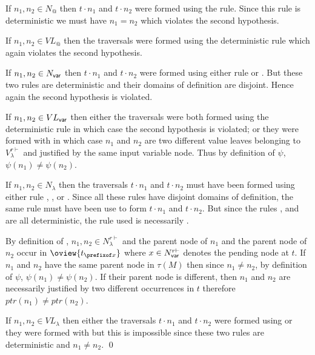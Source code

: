 \begin{compactitem}
\item If $n_1, n_2 \in N_@$ then $t
\cdot n_1$ and $t \cdot n_2$ were formed using the 
rule. Since this rule is deterministic we must have $n_1=n_2$ which
violates the second hypothesis.

\item If $n_1, n_2 \in VL_@$ then the traversals were formed using the deterministic rule
 which again violates the second
hypothesis.

\item If $n_1,n_2\in N_{\sf var}$ then
     $t \cdot n_1$ and $t \cdot n_2$ were formed using either rule  or .
     But these two rules are deterministic and their domains of definition are disjoint. Hence again the second
     hypothesis is violated.

\item If  $n_1, n_2 \in VL_{\sf var}$ then either the traversals were both formed using the deterministic rule
 in which case the second hypothesis
is violated; or they were formed with 
in which case $n_1$ and $n_2$ are two different value leaves belonging to
$V^{r\vdash}_\lambda$ and justified by the same input variable node.
Thus by definition of $\psi$, $\psi(n_1)\neq\psi(n_2)$.

\item If  $n_1,n_2\in N_\lambda$ then the traversals $t \cdot n_1$
    and $t \cdot n_2$ must have been formed using either rule
    , ,  or . Since all these rules have
    disjoint domains of definition, the same rule must have been use to
    form $t \cdot n_1$ and $t \cdot n_2$.
    But since the rules ,  and  are all deterministic,
    the rule used is necessarily .

    By definition of , $n_1,n_2\in N_\lambda^{r\vdash}$ and the parent node of $n_1$ and the parent node of $n_2$  occur in  $\oview{t_{\prefixof x}}$ where $x \in N^{r\vdash}_{\sf var}$
    denotes the pending node at $t$. If $n_1$ and $n_2$ have the same
    parent node in $\tau(M)$ then since $n_1\neq n_2$, by definition of
    $\psi$, $\psi(n_1)\neq \psi(n_2)$. If their parent node is
    different, then $n_1$ and $n_2$ are necessarily justified by two different
    occurrences in $t$ therefore $ptr(n_1) \neq ptr(n_2)$.

\item If  $n_1,n_2\in VL_\lambda$ then either the traversals $t \cdot n_1$
    and $t \cdot n_2$ were formed using
     or they were formed with
     but this is impossible since these two rules are
    deterministic and $n_1 \neq n_2$. \qed
\end{compactitem}


